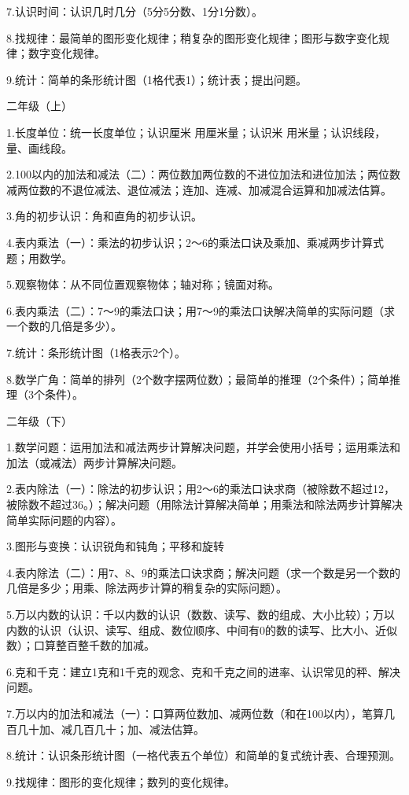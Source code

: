 7.认识时间：认识几时几分（5分5分数、1分1分数）。

8.找规律：最简单的图形变化规律；稍复杂的图形变化规律；图形与数字变化规律；数字变化规律。

9.统计：简单的条形统计图（1格代表1）；统计表；提出问题。

二年级（上）

1.长度单位：统一长度单位；认识厘米 用厘米量；认识米 用米量；认识线段，量、画线段。

2.100以内的加法和减法（二）：两位数加两位数的不进位加法和进位加法；两位数减两位数的不退位减法、退位减法；连加、连减、加减混合运算和加减法估算。

3.角的初步认识：角和直角的初步认识。

4.表内乘法（一）：乘法的初步认识；2～6的乘法口诀及乘加、乘减两步计算式题；用数学。

5.观察物体：从不同位置观察物体；轴对称；镜面对称。

6.表内乘法（二）：7～9的乘法口诀；用7～9的乘法口诀解决简单的实际问题（求一个数的几倍是多少）。

7.统计：条形统计图（1格表示2个）。

8.数学广角：简单的排列（2个数字摆两位数）；最简单的推理（2个条件）；简单推理（3个条件）。

二年级（下）

1.数学问题：运用加法和减法两步计算解决问题，并学会使用小括号；运用乘法和加法（或减法）两步计算解决问题。

2.表内除法（一）：除法的初步认识；用2～6的乘法口诀求商（被除数不超过12，被除数不超过36。）；解决问题（用除法计算解决简单；用乘法和除法两步计算解决简单实际问题的内容）。

3.图形与变换：认识锐角和钝角；平移和旋转

4.表内除法（二）：用7、8、9的乘法口诀求商；解决问题（求一个数是另一个数的几倍是多少；用乘、除法两步计算的稍复杂的实际问题）。

5.万以内数的认识：千以内数的认识（数数、读写、数的组成、大小比较）；万以内数的认识（认识、读写、组成、数位顺序、中间有0的数的读写、比大小、近似数）；口算整百整千数的加减。

6.克和千克：建立1克和1千克的观念、克和千克之间的进率、认识常见的秤、解决问题。

7.万以内的加法和减法（一）：口算两位数加、减两位数（和在100以内），笔算几百几十加、减几百几十；加、减法估算。

8.统计：认识条形统计图（一格代表五个单位）和简单的复式统计表、合理预测。

9.找规律：图形的变化规律；数列的变化规律。

